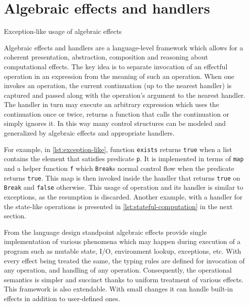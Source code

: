 \documentclass[inz, english, longabstract]{iithesis}
\begin{document}
\section{Algebraic effects and handlers}
\begin{listing}[t]
  \caption{Exception-like usage of algebraic effects}
  \label{lst:exception-like}
\end{listing}
Algebraic effects and handlers are a language-level framework which allows for a coherent presentation, abstraction, composition and reasoning about computational effects.
The key idea is to separate invocation of an effectful operation in an expression from the meaning of such an operation.
When one invokes an operation, the current continuation (up to the nearest handler) is captured and passed along with the operation's argument to the nearest handler.
The handler in turn may execute an arbitrary expression which uses the continuation once or twice, returns a function that calls the continuation or simply ignores it.
In this way many control structures can be modeled and generalized by algebraic effects and appropriate handlers.

For example, in \autoref{lst:exception-like}, function \texttt{exists} returns \texttt{true} when a list contains the element that satisfies predicate \texttt{p}.
It is implemented in terms of \texttt{map} and a helper function \texttt{f} which \texttt{Break}s normal control flow when the predicate returns \texttt{true}.
This map is then invoked inside the handler that returns \texttt{true} on \texttt{Break} and \texttt{false} otherwise.
This usage of operation and its handler is similar to exceptions, as the resumption is discarded.
Another example, with a handler for the state-like operations is presented in \autoref{lst:stateful-computation} in the next section.

From the language design standpoint algebraic effects provide single implementation of various phenomena which may happen during execution of a program such as mutable state, I/O, environment lookup, exceptions, etc.
With every effect being treated the same, the typing rules are defined for invocation of any operation, and handling of any operation.
Consequently, the operational semantics is simpler and succinct thanks to uniform treatment of various effects.
This framework is also extendable.
With small changes it can handle built-in effects in addition to user-defined ones.
\end{document}

